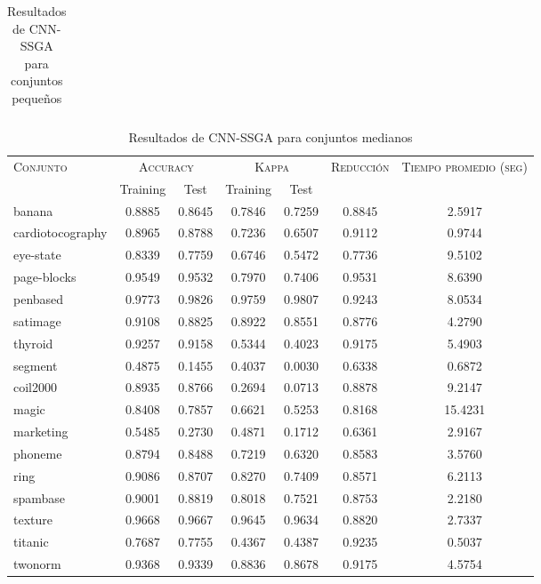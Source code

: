 \begin{table}[]
\begin{tabular}{l c c c c c c}
\hline
\end{tabular}
\caption{Resultados de CNN-SSGA para conjuntos pequeños }
\label{res-peq-cnn-ssga}
\end{table}


\begin{table}[]
\centering
\begin{tabular}{l c c c c c c}
\hline
\multirow{2}{*}{\textsc{Conjunto}}
	& \multicolumn{2}{c}{\textsc{Accuracy}}
	& \multicolumn{2}{c}{\textsc{Kappa}}
	& \textsc{Reducción}
	& \textsc{Tiempo promedio (seg)} \\
	& Training & Test
	& Training & Test \\ 
\hline
\hline

banana & 0.8885 & 0.8645 & 0.7846 & 0.7259 & 0.8845 & 2.5917 \\
cardiotocography & 0.8965 & 0.8788 & 0.7236 & 0.6507 & 0.9112 & 0.9744 \\
eye-state & 0.8339 & 0.7759 & 0.6746 & 0.5472 & 0.7736 & 9.5102 \\
page-blocks & 0.9549 & 0.9532 & 0.7970 & 0.7406 & 0.9531 & 8.6390 \\
penbased & 0.9773 & 0.9826 & 0.9759 & 0.9807 & 0.9243 & 8.0534 \\
satimage & 0.9108 & 0.8825 & 0.8922 & 0.8551 & 0.8776 & 4.2790 \\
thyroid & 0.9257 & 0.9158 & 0.5344 & 0.4023 & 0.9175 & 5.4903 \\
segment & 0.4875 & 0.1455 & 0.4037 & 0.0030 & 0.6338 & 0.6872 \\
coil2000 & 0.8935 & 0.8766 & 0.2694 & 0.0713 & 0.8878 & 9.2147 \\
magic & 0.8408 & 0.7857 & 0.6621 & 0.5253 & 0.8168 & 15.4231 \\
marketing & 0.5485 & 0.2730 & 0.4871 & 0.1712 & 0.6361 & 2.9167 \\
phoneme & 0.8794 & 0.8488 & 0.7219 & 0.6320 & 0.8583 & 3.5760 \\
ring & 0.9086 & 0.8707 & 0.8270 & 0.7409 & 0.8571 & 6.2113 \\
spambase & 0.9001 & 0.8819 & 0.8018 & 0.7521 & 0.8753 & 2.2180 \\
texture & 0.9668 & 0.9667 & 0.9645 & 0.9634 & 0.8820 & 2.7337 \\
titanic & 0.7687 & 0.7755 & 0.4367 & 0.4387 & 0.9235 & 0.5037 \\
twonorm & 0.9368 & 0.9339 & 0.8836 & 0.8678 & 0.9175 & 4.5754 \\

\hline
\end{tabular}
\caption{Resultados de CNN-SSGA para conjuntos medianos }
\label{res-med-cnn-ssga}
\end{table}


